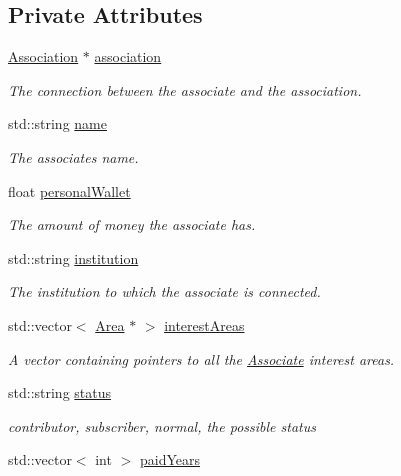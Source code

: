 \subsection*{Private Attributes}
\begin{DoxyCompactItemize}
\item 
\hyperlink{classAssociation}{Association} $\ast$ \hyperlink{classAssociate_a7871837a4c80adb4e39f2f67ae1bfce5}{association}
\begin{DoxyCompactList}\small\item\em The connection between the associate and the association. \end{DoxyCompactList}\item 
std\+::string \hyperlink{classAssociate_ad52875abacf1836cd879b7dffb88d589}{name}
\begin{DoxyCompactList}\small\item\em The associate\textquotesingle{}s name. \end{DoxyCompactList}\item 
float \hyperlink{classAssociate_adc7e2decb409cd226e1508c1c5df3b90}{personal\+Wallet}
\begin{DoxyCompactList}\small\item\em The amount of money the associate has. \end{DoxyCompactList}\item 
std\+::string \hyperlink{classAssociate_a25b82eab07e159a91ebdc64fa4d656ab}{institution}
\begin{DoxyCompactList}\small\item\em The institution to which the associate is connected. \end{DoxyCompactList}\item 
std\+::vector$<$ \hyperlink{classArea}{Area} $\ast$ $>$ \hyperlink{classAssociate_aa4083f0fff7ce7d580f7e2df8f9dbaf2}{interest\+Areas}
\begin{DoxyCompactList}\small\item\em A vector containing pointers to all the \hyperlink{classAssociate}{Associate} interest areas. \end{DoxyCompactList}\item 
std\+::string \hyperlink{classAssociate_aacf79a4e389c7db3d8636b788cb2089f}{status}
\begin{DoxyCompactList}\small\item\em contributor, subscriber, normal, the possible status \end{DoxyCompactList}\item 
std\+::vector$<$ int $>$ \hyperlink{classAssociate_ad7d373d77a5c49eb845e89729962c30d}{paid\+Years}

\end{DoxyCompactItemize}

